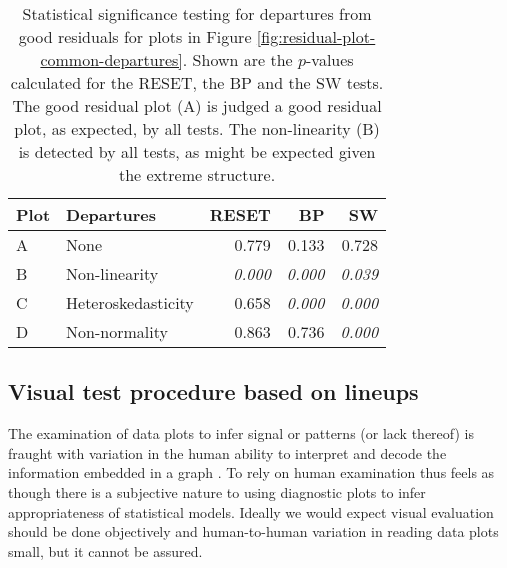 \documentclass[]{interact}
\theoremstyle{plain}%
\theoremstyle{definition}
\theoremstyle{remark}
\begin{document}
\begin{table}

\caption{\label{tab:example-residual-plot-table}Statistical significance testing for departures from good residuals for plots in Figure \ref{fig:residual-plot-common-departures}. Shown are the $p$-values calculated for the RESET, the BP and the SW tests. The good residual plot (A) is judged a good residual plot, as expected, by all tests. The non-linearity (B) is detected by all tests, as might be expected given the extreme structure.}
\centering
\begin{tabular}[t]{llrrr}
\toprule
Plot & Departures & RESET & BP & SW\\
\midrule
A & None & 0.779 & 0.133 & 0.728\\
B & Non-linearity & \em{0.000} & \em{0.000} & \em{0.039}\\
C & Heteroskedasticity & 0.658 & \em{0.000} & \em{0.000}\\
D & Non-normality & 0.863 & 0.736 & \em{0.000}\\
\bottomrule
\end{tabular}
\end{table}

\hypertarget{visual-test-procedure-based-on-lineups}{%
\subsection{Visual test procedure based on
lineups}\label{visual-test-procedure-based-on-lineups}}

The examination of data plots to infer signal or patterns (or lack
thereof) is fraught with variation in the human ability to interpret and
decode the information embedded in a graph
\citep{cleveland_graphical_1984}. To rely on human examination thus
feels as though there is a subjective nature to using diagnostic plots
to infer appropriateness of statistical models. Ideally we would expect
visual evaluation should be done objectively and human-to-human
variation in reading data plots small, but it cannot be assured.
\end{document}

